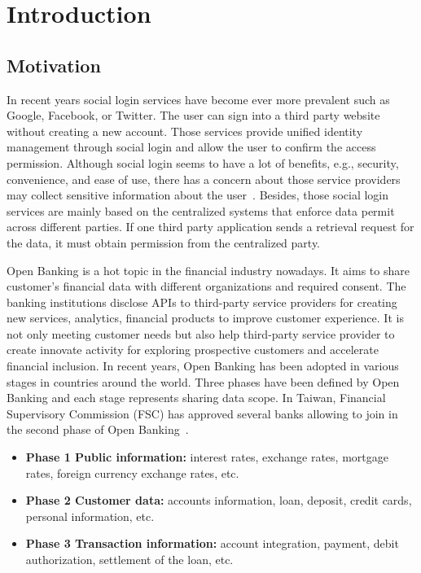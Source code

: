 \chapter{Introduction}
\label{chapter:intro}
\section{Motivation}
In recent years social login services have become ever more prevalent such as Google, Facebook, or Twitter. The user can sign into a third party website without creating a new account. Those services provide unified identity management through social login and allow the user to confirm the access permission. Although social login seems to have a lot of benefits, e.g., security, convenience, and ease of use, there has a concern about those service providers may collect sensitive information about the user~\cite{gafni2014social}.
Besides, those social login services are mainly based on the centralized systems that enforce data permit across different parties. If one third party application sends a retrieval request for the data, it must obtain permission from the centralized party.\par
Open Banking is a hot topic in the financial industry nowadays. It aims to share customer's financial data with different organizations and required consent. The banking institutions disclose APIs to third-party service providers for creating new services, analytics, financial products to improve customer experience. It is not only meeting customer needs but also help third-party service provider to create innovate activity for exploring prospective customers and accelerate financial inclusion. In recent years, Open Banking has been adopted in various stages in countries around the world. Three phases have been defined by Open Banking and each stage represents sharing data scope. In Taiwan, Financial Supervisory Commission (FSC) has approved several banks allowing to join in the second phase of Open Banking~\cite{thepaypers_2021}.\par

\begin{itemize}[noitemsep]
    \item \textbf{Phase 1 Public information:} interest rates, exchange rates, mortgage rates, foreign currency exchange rates, etc.
    \item \textbf{Phase 2 Customer data:} accounts information, loan, deposit, credit cards, personal information, etc.
    \item \textbf{Phase 3 Transaction information:} account integration, payment, debit authorization, settlement of the loan, etc.
\end{itemize}\par

